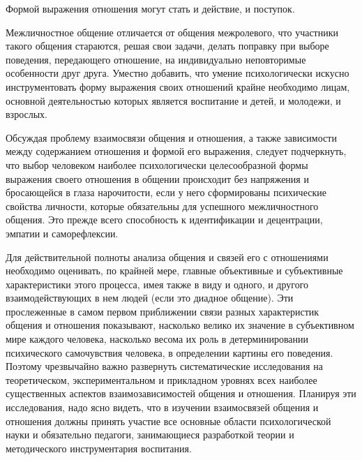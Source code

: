 Формой выражения отношения могут стать и действие, и поступок.

Межличностное общение отличается от общения межролевого, что участники такого общения стараются, решая свои задачи, делать поправку при выборе поведения, передающего отношение, на индивидуально неповторимые особенности друг друга. Уместно добавить, что умение психологически искусно инструментовать форму выражения своих отношений крайне необходимо лицам, основной деятельностью которых является воспитание и детей, и молодежи, и взрослых.

Обсуждая проблему взаимосвязи общения и отношения, а также зависимости между содержанием отношения и формой его выражения, следует подчеркнуть, что выбор человеком наиболее психологически целесообразной формы выражения своего отношения в общении происходит без напряжения и бросающейся в глаза нарочитости, если у него сформированы психические свойства личности, которые обязательны для успешного межличностного общения. Это прежде всего способность к идентификации и децентрации, эмпатии и саморефлексии.

Для действительной полноты анализа общения и связей его с отношениями необходимо оценивать, по крайней мере, главные объективные и субъективные характеристики этого процесса, имея также в виду и одного, и другого взаимодействующих в нем людей (если это диадное общение). Эти прослеженные в самом первом приближении связи разных характеристик общения и отношения показывают, насколько велико их значение в субъективном мире каждого человека, насколько весома их роль в детерминировании психического самочувствия человека, в определении картины его поведения. Поэтому чрезвычайно важно развернуть систематические исследования на теоретическом, экспериментальном и прикладном уровнях всех наиболее существенных аспектов взаимозависимостей общения и отношения. Планируя эти исследования, надо ясно видеть, что в изучении взаимосвязей общения и отношения должны принять участие все основные области психологической науки и обязательно педагоги, занимающиеся разработкой теории и методического инструментария воспитания.

